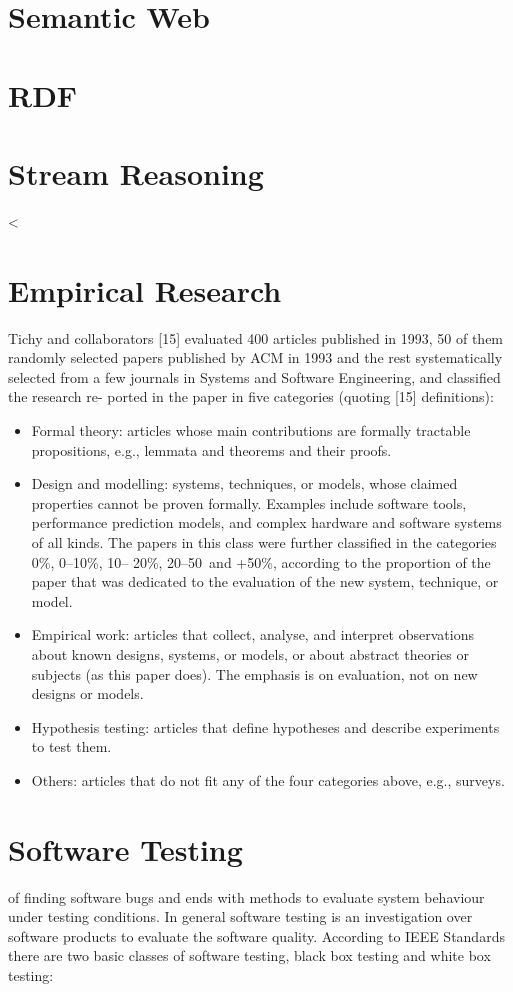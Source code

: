 \section{Semantic Web}

\section{RDF}


\section{Stream Reasoning}<
\section{Empirical Research}

Tichy and collaborators [15] evaluated 400 articles published in 1993, 50 of them randomly selected papers published by ACM in 1993 and the rest systematically selected from a few journals in Systems and Software Engineering, and classified the research re- ported in the paper in five categories (quoting [15] definitions): \begin{itemize}
\item Formal theory: articles whose main contributions are formally tractable propositions, e.g., lemmata and theorems and their proofs.
\item Design and modelling: systems, techniques, or models, whose claimed properties cannot be proven formally. Examples include software tools, performance prediction models, and complex hardware and software systems of all kinds. The papers in this class were further classified in the categories 0\%, 0–10\%, 10– 20\%, 20–50\, and +50\%, according to the proportion of the paper that was dedicated to the evaluation of the new system, technique, or model.
\item Empirical work: articles that collect, analyse, and interpret observations about known designs, systems, or models, or about abstract theories or subjects (as this paper does). The emphasis is on evaluation, not on new designs or models.
\item Hypothesis testing: articles that define hypotheses and describe experiments to test them.
\item Others: articles that do not fit any of the four categories above, e.g., surveys.
\end{itemize}

\section{Software Testing}
of finding software bugs and ends with methods to evaluate system behaviour under testing conditions. In general software testing is an investigation over software products to evaluate the software quality. According to IEEE Standards  \cite{citeulike:1341545} there are two basic classes of software testing, black box testing and white box testing: 

